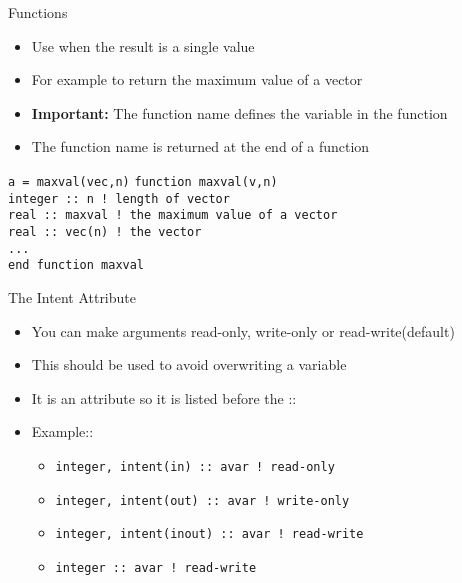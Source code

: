 \documentclass{beamer}
\begin{document}
\begin{frame}{Functions}

  \begin{itemize}
    \item Use when the result is a single value
    \vfill\item For example to return the maximum value of a vector
    \vfill\item \textbf{Important:} The function name defines the variable in the function
    \vfill\item The function name is returned at the end of a function
  \end{itemize}
  \vfill
  \texttt{a = maxval(vec,n)}
  \vfill
  \texttt{function maxval(v,n)} \\
  \hspace{0.1cm} \texttt{integer :: n ! length of vector} \\
  \hspace{0.1cm} \texttt{real :: maxval ! the maximum value of a vector} \\
  \hspace{0.1cm} \texttt{real :: vec(n) ! the vector} \\
  \hspace{0.1cm} \texttt{...} \\
  \texttt{end function maxval}

\end{frame}
\begin{frame}{The Intent Attribute}

  \begin{itemize}
    \item You can make arguments read-only, write-only or read-write(default)
    \vfill\item This should be used to avoid overwriting a variable
    \vfill\item It is an attribute so it is listed before the ::
    \vfill\item Example::
      \begin{itemize}
	\item \texttt{integer, intent(in) :: avar ! read-only}
	\item \texttt{integer, intent(out) :: avar ! write-only}
	\item \texttt{integer, intent(inout) :: avar ! read-write}
	\item \texttt{integer :: avar ! read-write}
      \end{itemize}
  \end{itemize}

\end{frame}
\end{document}
